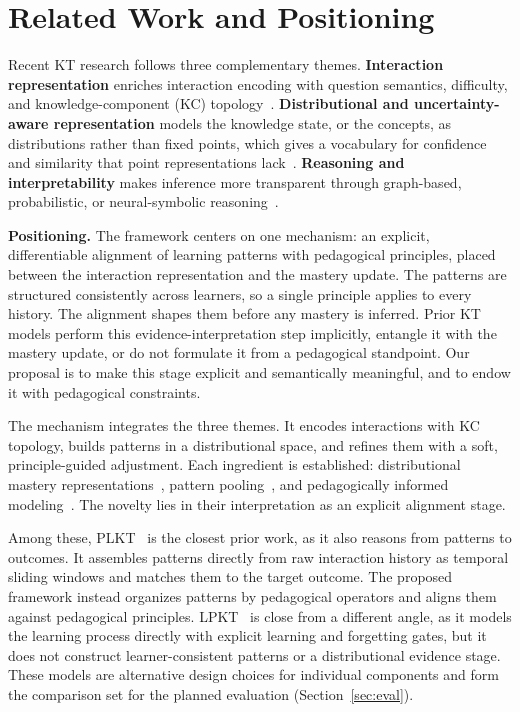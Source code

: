 \documentclass[conference]{IEEEtran}
\begin{document}
\section{Related Work and Positioning}
\label{sec:related}

Recent KT research follows three complementary themes. \textbf{Interaction representation} enriches interaction encoding with question semantics, difficulty, and knowledge-component (KC) topology~\cite{li2025mckt, xia2025cmdkt}. \textbf{Distributional and uncertainty-aware representation} models the knowledge state, or the concepts, as distributions rather than fixed points, which gives a vocabulary for confidence and similarity that point representations lack~\cite{chen2025ukt, li2025keenkt, wu2026sskt}. \textbf{Reasoning and interpretability} makes inference more transparent through graph-based, probabilistic, or neural-symbolic reasoning~\cite{nakagawa2019gkt, zhou2024psikt, hooshyar2026nskt, wu2026plkt}.

\smallskip\noindent\textbf{Positioning.} The framework centers on one mechanism: an explicit, differentiable alignment of learning patterns with pedagogical principles, placed between the interaction representation and the mastery update. The patterns are structured consistently across learners, so a single principle applies to every history. The alignment shapes them before any mastery is inferred. Prior KT models perform this evidence-interpretation step implicitly, entangle it with the mastery update, or do not formulate it from a pedagogical standpoint. Our proposal is to make this stage explicit and semantically meaningful, and to endow it with pedagogical constraints.

The mechanism integrates the three themes. It encodes interactions with KC topology, builds patterns in a distributional space, and refines them with a soft, principle-guided adjustment. Each ingredient is established: distributional mastery representations~\cite{zhou2024psikt,wu2026plkt,li2025keenkt}, pattern pooling~\cite{wu2026plkt}, and pedagogically informed modeling~\cite{hooshyar2026nskt}. The novelty lies in their interpretation as an explicit alignment stage.

Among these, PLKT~\cite{wu2026plkt} is the closest prior work, as it also reasons from patterns to outcomes. It assembles patterns directly from raw interaction history as temporal sliding windows and matches them to the target outcome. The proposed framework instead organizes patterns by pedagogical operators and aligns them against pedagogical principles. LPKT~\cite{shen2021lpkt} is close from a different angle, as it models the learning process directly with explicit learning and forgetting gates, but it does not construct learner-consistent patterns or a distributional evidence stage. These models are alternative design choices for individual components and form the comparison set for the planned evaluation (Section~\ref{sec:eval}).
\end{document}
